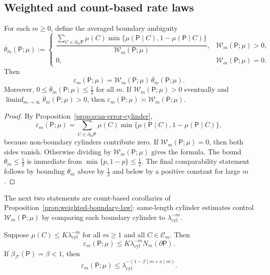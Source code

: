 \subsection{Weighted and count-based rate laws}

\begin{proposition}
\label{prop:weighted-boundary-law}
For each $m\ge 0$, define the averaged boundary ambiguity
\[
\overline{\theta}_m(\mathsf{P};\mu)
:=
\begin{cases}
\dfrac{\sum_{C\in\partial_m\mathsf{P}}
\mu(C)\min\{\mu(\mathsf{P}\mid C),1-\mu(\mathsf{P}\mid C)\}}
{\mathcal{W}_m(\mathsf{P};\mu)}, & \mathcal{W}_m(\mathsf{P};\mu)>0,\\[2ex]
0, & \mathcal{W}_m(\mathsf{P};\mu)=0.
\end{cases}
\]
Then
\[
\varepsilon_m(\mathsf{P};\mu)
=\mathcal{W}_m(\mathsf{P};\mu)\,\overline{\theta}_m(\mathsf{P};\mu).
\]
Moreover, $0\le \overline{\theta}_m(\mathsf{P};\mu)\le \frac12$ for all $m$.
If $\mathcal{W}_m(\mathsf{P};\mu)>0$ eventually and
$\liminf_{m\to\infty}\overline{\theta}_m(\mathsf{P};\mu)>0$, then
$\varepsilon_m(\mathsf{P};\mu)\asymp \mathcal{W}_m(\mathsf{P};\mu)$.
\end{proposition}

\begin{proof}
By Proposition~\ref{prop:scan-error-cylinder},
\[
\varepsilon_m(\mathsf{P};\mu)
=\sum_{C\in\partial_m\mathsf{P}}
\mu(C)\min\{\mu(\mathsf{P}\mid C),1-\mu(\mathsf{P}\mid C)\},
\]
because non-boundary cylinders contribute zero.  If $\mathcal{W}_m(\mathsf{P};\mu)=0$,
then both sides vanish.  Otherwise dividing by $\mathcal{W}_m(\mathsf{P};\mu)$ gives the
formula.  The bound $\overline{\theta}_m\le\frac12$ is immediate from
$\min\{p,1-p\}\le\frac12$.  The final comparability statement follows by
bounding $\overline{\theta}_m$ above by $\frac12$ and below by a positive
constant for large $m$.
\end{proof}

The next two statements are count-based corollaries of
Proposition~\ref{prop:weighted-boundary-law}: same-length cylinder estimates
control $\mathcal{W}_m(\mathsf{P};\mu)$ by comparing each boundary cylinder to
$\lambda_{\mathrm{cyl}}^{-m}$.

\begin{proposition}
\label{prop:boundary-dimension}
Suppose $\mu(C)\le K\lambda_{\mathrm{cyl}}^{-m}$ for all $m\ge 1$ and all
$C\in\mathcal{C}_m$.  Then
\[
\varepsilon_m(\mathsf{P};\mu)\le K\lambda_{\mathrm{cyl}}^{-m}N_m(\partial\mathsf{P}).
\]
If $\overline{\beta}_{\mathcal{F}}(\mathsf{P})=\beta<1$, then
\[
\varepsilon_m(\mathsf{P};\mu)\le\lambda_{\mathrm{cyl}}^{-(1-\beta)m+o(m)}.
\]
\end{proposition}

